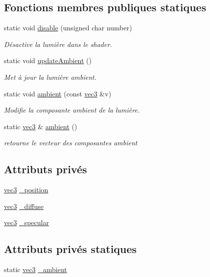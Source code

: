 \subsection*{Fonctions membres publiques statiques}
\begin{DoxyCompactItemize}
\item 
static void \hyperlink{class_light_a33a43afc95ed75a8970f523cb3f800fa}{disable} (unsigned char number)
\begin{DoxyCompactList}\small\item\em Désactive la lumière dans le shader. \end{DoxyCompactList}\item 
static void \hyperlink{class_light_a53ce58fd783207da18aa7dc3465841ac}{update\+Ambient} ()
\begin{DoxyCompactList}\small\item\em Met à jour la lumière ambient. \end{DoxyCompactList}\item 
static void \hyperlink{class_light_a1eae781d5e7a95c9dcc9bd76838496df}{ambient} (const \hyperlink{structvec3}{vec3} \&v)
\begin{DoxyCompactList}\small\item\em Modifie la composante ambient de la lumière. \end{DoxyCompactList}\item 
static \hyperlink{structvec3}{vec3} \& \hyperlink{class_light_a4f9a64ec04c9854d02a67cd2ceb6760c}{ambient} ()
\begin{DoxyCompactList}\small\item\em retourne le vecteur des composantes ambient \end{DoxyCompactList}\end{DoxyCompactItemize}
\subsection*{Attributs privés}
\begin{DoxyCompactItemize}
\item 
\hyperlink{structvec3}{vec3} \hyperlink{class_light_a3af8c823a869606782bd9e1872586b72}{\+\_\+position}
\item 
\hyperlink{structvec3}{vec3} \hyperlink{class_light_a32445f2054766ef532c29eb514b2599d}{\+\_\+diffuse}
\item 
\hyperlink{structvec3}{vec3} \hyperlink{class_light_a36414dc1e8a75b36652bc5a12b2ea43d}{\+\_\+specular}
\end{DoxyCompactItemize}
\subsection*{Attributs privés statiques}
\begin{DoxyCompactItemize}
\item 
static \hyperlink{structvec3}{vec3} \hyperlink{class_light_ab139b739498b75944c99203027332ad9}{\+\_\+ambient}
\end{DoxyCompactItemize}



